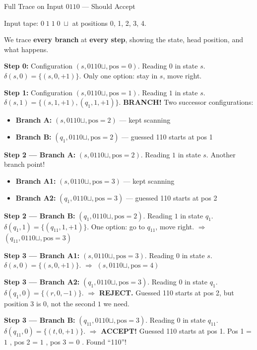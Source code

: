 \begin{examplebox}{Full Trace on Input $0110$ --- Should Accept}

Input tape: $\boxed{0}\;\boxed{1}\;\boxed{1}\;\boxed{0}\;\boxed{\sqcup}$
at positions 0, 1, 2, 3, 4.

We trace \textbf{every branch} at \textbf{every step}, showing the state, head
position, and what happens.

\textbf{Step 0:} Configuration $(s, 0110\sqcup, \text{pos}=0)$.
Reading $0$ in state $s$. $\delta(s, 0) = \{(s, 0, +1)\}$. Only one option:
stay in $s$, move right.

\textbf{Step 1:} Configuration $(s, 0110\sqcup, \text{pos}=1)$.
Reading $1$ in state $s$. $\delta(s, 1) = \{(s, 1, +1), (q_1, 1, +1)\}$.
\textbf{BRANCH!} Two successor configurations:
\begin{itemize}[nosep]
\item \textbf{Branch A:} $(s, 0110\sqcup, \text{pos}=2)$ --- kept scanning
\item \textbf{Branch B:} $(q_1, 0110\sqcup, \text{pos}=2)$ --- guessed 110
  starts at pos 1
\end{itemize}

\textbf{Step 2 --- Branch A:} $(s, 0110\sqcup, \text{pos}=2)$.
Reading $1$ in state $s$. Another branch point!
\begin{itemize}[nosep]
\item \textbf{Branch A1:} $(s, 0110\sqcup, \text{pos}=3)$ --- kept scanning
\item \textbf{Branch A2:} $(q_1, 0110\sqcup, \text{pos}=3)$ --- guessed 110
  starts at pos 2
\end{itemize}

\textbf{Step 2 --- Branch B:} $(q_1, 0110\sqcup, \text{pos}=2)$.
Reading $1$ in state $q_1$. $\delta(q_1, 1) = \{(q_{11}, 1, +1)\}$.
One option: go to $q_{11}$, move right.
$\Rightarrow$ $(q_{11}, 0110\sqcup, \text{pos}=3)$

\textbf{Step 3 --- Branch A1:} $(s, 0110\sqcup, \text{pos}=3)$.
Reading $0$ in state $s$. $\delta(s, 0) = \{(s, 0, +1)\}$.
$\Rightarrow$ $(s, 0110\sqcup, \text{pos}=4)$

\textbf{Step 3 --- Branch A2:} $(q_1, 0110\sqcup, \text{pos}=3)$.
Reading $0$ in state $q_1$. $\delta(q_1, 0) = \{(r, 0, -1)\}$.
$\Rightarrow$ \textcolor{red!70!black}{\textbf{REJECT.}} Guessed 110 starts at
pos 2, but position 3 is $0$, not the second $1$ we need.

\textbf{Step 3 --- Branch B:} $(q_{11}, 0110\sqcup, \text{pos}=3)$.
Reading $0$ in state $q_{11}$. $\delta(q_{11}, 0) = \{(t, 0, +1)\}$.
$\Rightarrow$ \textcolor{green!60!black}{\textbf{ACCEPT!}} Guessed 110 starts
at pos 1. Pos 1 = $1$ {\checkmark}, pos 2 = $1$ {\checkmark}, pos 3 = $0$
{\checkmark}. Found ``110''!


\end{examplebox}
